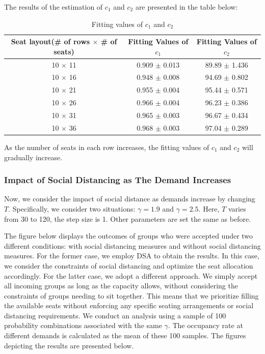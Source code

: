 The results of the estimation of $c_1$ and $c_2$ are presented in the table below:

\begin{table}[ht]
  \centering
  \caption{Fitting values of $c_1$ and $c_2$}
  \begin{tabular}{|c|c|c|}
  \hline
   Seat layout(\# of rows $\times$ \# of seats) & Fitting Values of $c_1$ & Fitting Values of $c_2$  \\
  \hline
   10 $\times$ 11 & 0.909 $\pm$ 0.013  & 89.89 $\pm$ 1.436 \\
   10 $\times$ 16 & 0.948 $\pm$ 0.008  & 94.69 $\pm$ 0.802 \\
   10 $\times$ 21 & 0.955 $\pm$ 0.004 & 95.44 $\pm$ 0.571 \\
   10 $\times$ 26 & 0.966 $\pm$ 0.004 & 96.23 $\pm$ 0.386 \\
   10 $\times$ 31 & 0.965 $\pm$ 0.003 & 96.67 $\pm$ 0.434 \\
   10 $\times$ 36 & 0.968 $\pm$ 0.003 & 97.04 $\pm$ 0.289 \\
   \hline
  \end{tabular}
\end{table}

As the number of seats in each row increases, the fitting values of $c_1$ and $c_2$ will gradually increase.


\subsubsection{Impact of Social Distancing as The Demand Increases}
Now, we consider the impact of social distance as demands increase by changing $T$. Specifically, we consider two situations: $\gamma = 1.9$ and $\gamma = 2.5$. Here, $T$ varies from 30 to 120, the step size is 1. Other parameters are set the same as before.

The figure below displays the outcomes of groups who were accepted under two different conditions: with social distancing measures and without social distancing measures. For the former case, we employ DSA to obtain the results. In this case, we consider the constraints of social distancing and optimize the seat allocation accordingly. For the latter case, we adopt a different approach. We simply accept all incoming groups as long as the capacity allows, without considering the constraints of groups needing to sit together. This means that we prioritize filling the available seats without enforcing any specific seating arrangements or social distancing requirements. We conduct an analysis using a sample of 100 probability combinations associated with the same $\gamma$. The occupancy rate at different demands is calculated as the mean of these 100 samples. The figures depicting the results are presented below.

